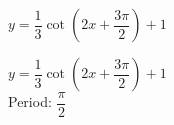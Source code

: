 {$y = \dfrac{1}{3} \cot \left( 2x + \dfrac{3\pi}{2} \right) + 1$}
{$y = \dfrac{1}{3} \cot \left( 2x + \dfrac{3\pi}{2} \right) + 1$\\
Period: $\dfrac{\pi}{2}$

\begin{center}
\end{center}
}
